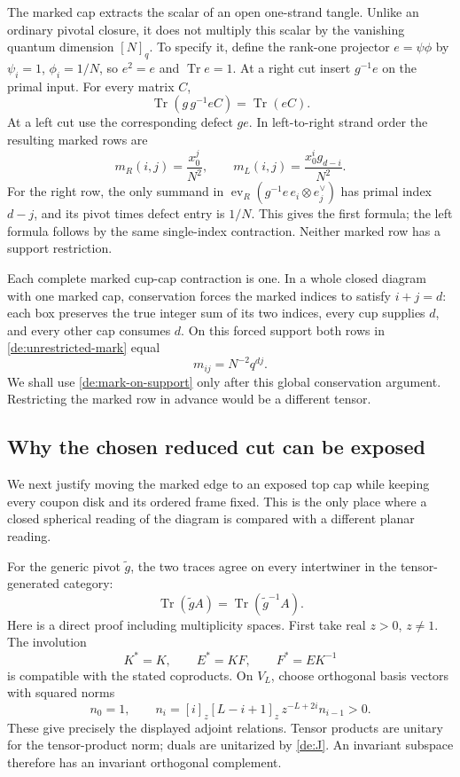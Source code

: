 The marked cap extracts the scalar of an open one-strand tangle.
Unlike an ordinary pivotal closure, it does not multiply this scalar
by the vanishing quantum dimension \([N]_q\). To specify it, define
the rank-one projector \(e=\psi\phi\) by
\(\psi_i=1\), \(\phi_i=1/N\), so \(e^2=e\) and
\(\operatorname{Tr}e=1\). At a right cut insert \(g^{-1}e\)
on the primal input. For every matrix \(C\),
\[
                 \operatorname{Tr}(g\,g^{-1}eC)
                           =\operatorname{Tr}(eC).
\]
At a left cut use the corresponding defect \(ge\). In
left-to-right strand order the resulting marked rows are
\begin{equation}\label{de:unrestricted-mark}
 m_R(i,j)=\frac{x_0^j}{N^2},\qquad
 m_L(i,j)=\frac{x_0^i g_{d-i}}{N^2}.
\end{equation}
For the right row, the only summand in
\(\operatorname{ev}_R(g^{-1}e\,e_i\otimes e_j^\vee)\)
has primal index \(d-j\), and its pivot times defect entry is
\(1/N\). This gives the first formula; the left formula follows
by the same single-index contraction. Neither marked row has a
support restriction.

Each complete marked cup-cap contraction is one. In a whole
closed diagram with one marked cap, conservation forces the
marked indices to satisfy \(i+j=d\): each box preserves the true
integer sum of its two indices, every cup supplies \(d\), and
every other cap consumes \(d\). On this forced support both
rows in \eqref{de:unrestricted-mark} equal
\begin{equation}\label{de:mark-on-support}
                         m_{ij}=N^{-2}q^{dj}.
\end{equation}
We shall use \eqref{de:mark-on-support} only after this global
conservation argument. Restricting the marked row in advance
would be a different tensor.

\subsection{Why the chosen reduced cut can be exposed}

We next justify moving the marked edge to an exposed top cap
while keeping every coupon disk and its ordered frame fixed.
This is the only place where a closed spherical reading of the
diagram is compared with a different planar reading.

For the generic pivot \(\widetilde g\), the two traces agree on
every intertwiner in the tensor-generated category:
\begin{equation}\label{de:spherical-traces}
 \operatorname{Tr}(\widetilde gA)
       =\operatorname{Tr}(\widetilde g^{-1}A).
\end{equation}
Here is a direct proof including multiplicity spaces. First take
real \(z>0\), \(z\ne1\). The involution
\[
                  K^*=K,\qquad E^*=KF,\qquad F^*=EK^{-1}
\]
is compatible with the stated coproducts. On \(V_L\), choose
orthogonal basis vectors with squared norms
\[
 n_0=1,\qquad
 n_i=[i]_z[L-i+1]_z\,z^{-L+2i}n_{i-1}>0.
\]
These give precisely the displayed adjoint relations. Tensor
products are unitary for the tensor-product norm; duals are
unitarized by \eqref{de:J}. An invariant subspace therefore has
an invariant orthogonal complement.

